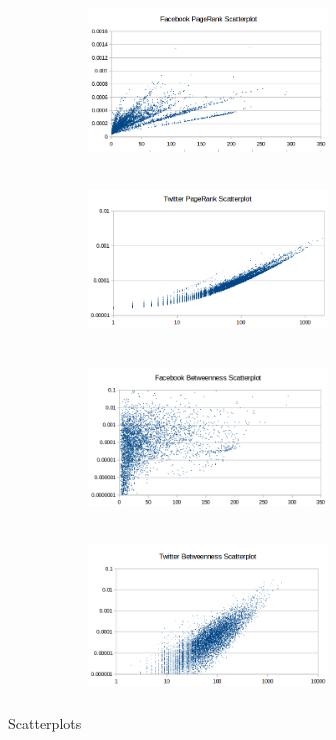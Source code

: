 \documentclass[spanish]{assignment}
\begin{document}
\begin{figure}[ht!]
\begin{subfigure}[t!]{0.5\textwidth}
\begin{subfigure}[t!]{\textwidth}
				\end{subfigure}
			\end{subfigure}
			\begin{subfigure}[t!]{0.5\textwidth}
				\begin{subfigure}[t!]{\textwidth}
					\centering
					\includegraphics[width=180pt, height=120pt]{img/facebook_pr_s.png}
				\end{subfigure}
				\begin{subfigure}[t!]{\textwidth}
					\centering
					\includegraphics[width=180pt, height=120pt]{img/twitter_pr_s.png}
				\end{subfigure}
			\end{subfigure}
			\begin{subfigure}[t!]{0.5\textwidth}
				\begin{subfigure}[t!]{\textwidth}
					\centering
					\includegraphics[width=180pt, height=120pt]{img/facebook_b_s.png}
				\end{subfigure}
				\begin{subfigure}[t!]{\textwidth}
					\centering
					\includegraphics[width=180pt, height=120pt]{img/twitter_b_s.png}
				\end{subfigure}
			\end{subfigure}
			\caption{%
				Scatterplots
			}%
			\label{scatters}
		\end{figure}
	
\end{document}
